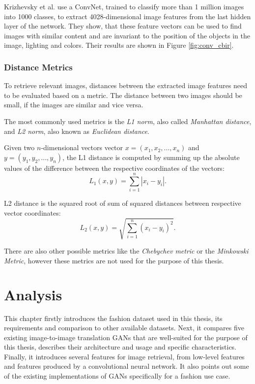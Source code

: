 \documentclass[12pt]{report}
\begin{document}
Krizhevsky et al. \cite{NIPS2012_4824} use a ConvNet, trained to classify more than 1 million images into 1000 classes, to extract 4028-dimensional image features from the last hidden layer of the network. They show, that these feature vectors can be used to find images with similar content and are invariant to the position of the objects in the image, lighting and colors. Their results are shown in Figure \ref{fig:conv_cbir}.


\pagebreak
\subsection{Distance Metrics}
To retrieve relevant images, distances between the extracted image features need to be evaluated based on a metric. The distance between two images should be small, if the images are similar and vice versa. 

The most commonly used metrics is the \textit{L1 norm}, also called \textit{Manhattan distance}, and \textit{L2 norm}, also known as \textit{Euclidean distance}.

Given two $n$-dimensional vectors vector $x = (x_1, x_2, ..., x_n)$ and $y = (y_1, y_2, ..., y_n)$, the L1 distance is computed by summing up the absolute values of the difference between the respective coordinates of the vectors:
\begin{equation}
L_1(x, y) = \sum_{i=1}^{n} |x_i - y_i|.
\end{equation} 

L2 distance is the squared root of sum of squared distances between respective vector coordinates:
\begin{equation}
L_2(x, y) = \sqrt{\sum_{i=1}^{n} (x_i - y_i)^2}.
\end{equation}

There are also other possible metrics like the \textit{Chebychev metric} or the \textit{Minkowski Metric}, however these metrics are not used for the purpose of this thesis. 


\pagebreak
\chapter{Analysis}
This chapter firstly introduces the fashion dataset used in this thesis, its requirements and comparison to other available datasets. Next, it compares five existing image-to-image translation GANs that are well-suited for the purpose of this thesis, describes their architecture and usage and specific characteristics. Finally, it introduces several features for image retrieval, from low-level features and features produced by a convolutional neural network. It also points out some of the existing implementations of GANs specifically for a fashion use case.
\end{document}
